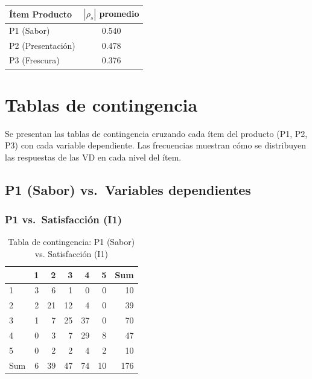 \documentclass[
  spanish,
]{article}
\begin{document}
\begin{table}[!h]
\centering
\begin{tabular}{lc}
\toprule
Ítem Producto & $|\rho_s|$ promedio\\
\midrule
P1 (Sabor) & 0.540\\
P2 (Presentación) & 0.478\\
P3 (Frescura) & 0.376\\
\bottomrule
\end{tabular}
\end{table}

\newpage

\section{Tablas de contingencia}\label{tablas-de-contingencia}

Se presentan las tablas de contingencia cruzando cada ítem del producto
(P1, P2, P3) con cada variable dependiente. Las frecuencias muestran
cómo se distribuyen las respuestas de las VD en cada nivel del ítem.

\subsection{P1 (Sabor) vs.~Variables
dependientes}\label{p1-sabor-vs.-variables-dependientes}

\subsubsection{P1 vs.~Satisfacción
(I1)}\label{p1-vs.-satisfacciuxf3n-i1}

\begin{table}[!h]
\centering
\caption{\label{tab:cont-p1-satisf}Tabla de contingencia: P1 (Sabor) vs. Satisfacción (I1)}
\centering
\begin{tabular}[t]{lrrrrrr}
\toprule
  & 1 & 2 & 3 & 4 & 5 & Sum\\
\midrule
1 & 3 & 6 & 1 & 0 & 0 & 10\\
2 & 2 & 21 & 12 & 4 & 0 & 39\\
3 & 1 & 7 & 25 & 37 & 0 & 70\\
4 & 0 & 3 & 7 & 29 & 8 & 47\\
5 & 0 & 2 & 2 & 4 & 2 & 10\\
\addlinespace
Sum & 6 & 39 & 47 & 74 & 10 & 176\\
\bottomrule
\end{tabular}
\end{table}
\end{document}
